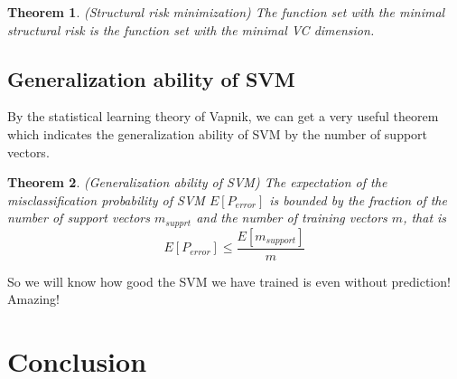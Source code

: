 \documentclass[a4paper]{report}
\newtheorem{theorem}{Theorem}[section]
\begin{document}
\begin{theorem}
    (Structural risk minimization) The function set with the minimal structural risk is the function set with the minimal VC dimension.
\end{theorem}

\section{Generalization ability of SVM}

By the statistical learning theory of Vapnik, we can get a very useful theorem which indicates the generalization ability of SVM by the number of support vectors.

\begin{theorem}
    (Generalization ability of SVM\cite{cortes1995support}) The expectation of the misclassification probability of SVM $E[P_{error}]$ is bounded by the fraction of the number of support vectors $m_{supprt}$ and the number of training vectors $m$, that is
    \[
        E[P_{error}]\leq\frac{E[m_{support}]}{m}
    \]
\end{theorem}

So we will know how good the SVM we have trained is even without prediction! Amazing!

\chapter{Conclusion}

{}

\end{document}
